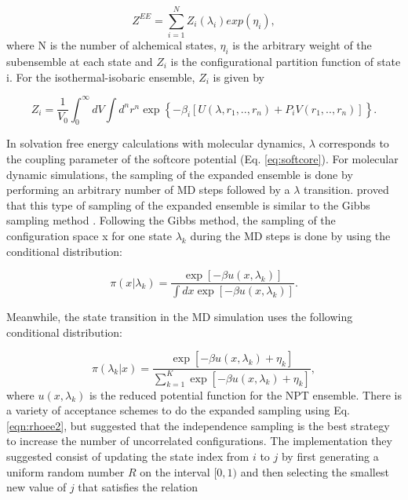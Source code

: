 	\begin{equation}
	Z^{EE} = \sum_{i=1}^{N} Z_{i}(\lambda_{i}) exp(\eta_{i}),
	\label{eqn:ee}
	\end{equation}   
	where N is the number of alchemical states, $\eta_{i}$ is the arbitrary weight of the subensemble at each state and $Z_{i}$ is the configurational partition function of state i. For the isothermal-isobaric ensemble, $Z_{i}$ is given by
	
	\begin{equation}
	Z_{i} = \frac{1}{V_{0}} {\int_{0}^{\infty} dV \int d^{n}r^{n} \exp \left \lbrace -\beta_{i} \left[ U(\lambda, r_{1},..,r_{n}) + P_{i}V(r_{1},..,r_{n}) \right] \right \rbrace}.
	\end{equation} 
	
	In solvation free energy calculations with molecular dynamics, $\lambda$ corresponds to the coupling parameter of the softcore potential (Eq. \ref{eq:softcore}). For molecular dynamic simulations, the sampling of the expanded ensemble is done by performing an arbitrary number of MD  steps followed by a $\lambda$ transition.  proved that this type of sampling of the expanded ensemble is similar to the Gibbs sampling method \cite{geman1984,liu2002}. Following the Gibbs method, the sampling of the configuration space x for one state $\lambda_{k}$ during the MD steps is done by using the conditional distribution:
	
	\begin{equation}
	\pi(x|\lambda_{k}) = \dfrac{\exp[-\beta u(x,\lambda_{k})]}{\int dx \exp [- \beta u(x,\lambda_{k})]}.
	\label{eqn:rhoee1}
	\end{equation} 
	
	Meanwhile, the state transition in the MD simulation uses the following conditional distribution:
	
	\begin{equation}
	\pi(\lambda_{k}|x) = \dfrac{\exp[-\beta u(x,\lambda_{k}) + \eta_{k}]}{ \sum_{k=1}^{K} \exp [- \beta u(x,\lambda_{k})+ \eta_{k}]},
	\label{eqn:rhoee2}
	\end{equation} 
	where $u(x,\lambda_{k})$ is the reduced potential function for the NPT ensemble. There is a variety of acceptance schemes to do the expanded sampling using Eq. \eqref{eqn:rhoee2}, but  suggested that the independence sampling \cite{liu2002} is the best strategy to increase the number of uncorrelated configurations. The implementation they suggested consist of updating the state index from $i$ to $j$ by first generating a uniform random number $R$ on the interval $[0,1)$ and then selecting the smallest new value of $j$ that satisfies  the relation
	

